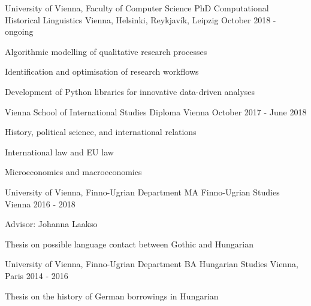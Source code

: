 

\begin{cventries}

  \cventry
    {University of Vienna, Faculty of Computer Science} %
    {PhD Computational Historical Linguistics} %
    {Vienna, Helsinki, Reykjavík, Leipzig} %
    {October 2018 - ongoing} %
    {
      \begin{cvitems} %
        \item{Algorithmic modelling of qualitative research processes}
        \item{Identification and optimisation of research workflows}
        \item{Development of Python libraries for innovative data-driven analyses}
      \end{cvitems}
    }

  \cventry
    {Vienna School of International Studies} %
    {Diploma} %
    {Vienna} %
    {October 2017 - June 2018} %
    {
    \begin{cvitems} %
        \item{History, political science, and international relations}
        \item{International law and EU law}
        \item{Microeconomics and macroeconomics}
      \end{cvitems}
    }
    
  \cventry
    {University of Vienna, Finno-Ugrian Department} %
    {MA Finno-Ugrian Studies} %
    {Vienna} %
    {2016 - 2018} %
    {
      \begin{cvitems} %
        \item {Advisor: Johanna Laakso}
        \item {Thesis on possible language contact between Gothic and Hungarian}
      \end{cvitems}
    }

  \cventry
    {University of Vienna, Finno-Ugrian Department} %
    {BA Hungarian Studies} %
    {Vienna, Paris} %
    {2014 - 2016} %
    {
      \begin{cvitems} %
        \item {Thesis on the history of German borrowings in Hungarian}
      \end{cvitems}
    }

\end{cventries}
